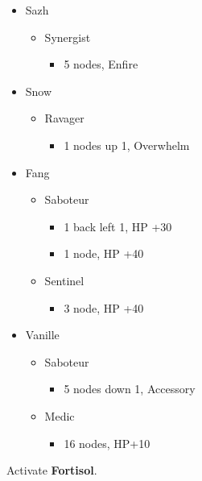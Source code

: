 	\begin{menu}
		\begin{itemize}
			\crystarium
			\begin{itemize}
				\item Sazh
				      \begin{itemize}
					      \item Synergist
					            \begin{itemize}
						            \item 5 nodes, Enfire
					            \end{itemize}
				      \end{itemize}
				\item Snow
				      \begin{itemize}
					      \item Ravager
					            \begin{itemize}
						            \item 1 nodes up 1, Overwhelm
					            \end{itemize}
				      \end{itemize}
				\item Fang
				      \begin{itemize}
					      \item Saboteur
					            \begin{itemize}
						            \item 1 back left 1, HP +30
						            \item 1 node, HP +40
					            \end{itemize}
					      \item Sentinel
					            \begin{itemize}
						            \item 3 node, HP +40
					            \end{itemize}
				      \end{itemize}
				\item Vanille
				      \begin{itemize}
					      \item Saboteur
					            \begin{itemize}
						            \item 5 nodes down 1, Accessory
					            \end{itemize}
					      \item Medic
					            \begin{itemize}
						            \item 16 nodes, HP+10
					            \end{itemize}
				      \end{itemize}
			\end{itemize}

		\end{itemize}
	\end{menu}
	 Activate \textbf{Fortisol}.
	\vfill

